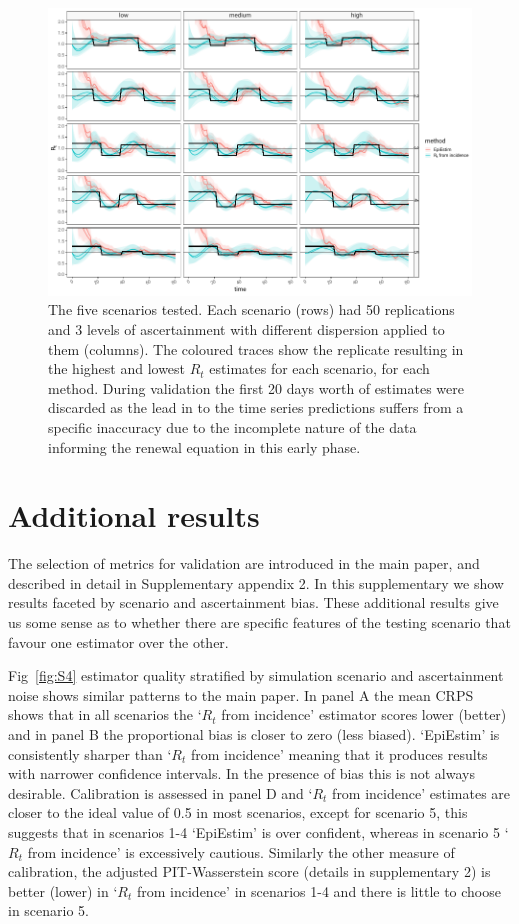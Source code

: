 \documentclass[a4paper, 12pt, twoside]{article}
\let\Oldsection\section
\renewcommand{\section}{\FloatBarrier\Oldsection}
\begin{document}
\begin{figure}[h!]
\centering
  \includegraphics{fig/fig3-scenario-estimates}
  \caption{The five scenarios tested. Each scenario (rows) had 50 replications and 3 levels of ascertainment with different dispersion applied to them (columns). The coloured traces show the replicate resulting in the highest and lowest $R_t$ estimates for each scenario, for each method. During validation the first 20 days worth of estimates were discarded as the lead in to the time series predictions suffers from a specific inaccuracy due to the incomplete nature of the data informing the renewal equation in this early phase.}
\label{fig:S3}
\end{figure}

\clearpage

\section{Additional results}

The selection of metrics for validation are introduced in the main paper, and described in detail in Supplementary appendix 2. In this supplementary we show results faceted by scenario and ascertainment bias. These additional results give us some sense as to whether there are specific features of the testing scenario that favour one estimator over the other.

Fig~\ref{fig:S4} estimator quality stratified by simulation scenario and ascertainment noise shows similar patterns to the main paper. In panel A the mean CRPS shows that in all scenarios the `$R_t$ from incidence' estimator scores lower (better) and in panel B the proportional bias is closer to zero (less biased). `EpiEstim' is consistently sharper than `$R_t$ from incidence' meaning that it produces results with narrower confidence intervals. In the presence of bias this is not always desirable. Calibration is assessed in panel D and `$R_t$ from incidence' estimates are closer to the ideal value of 0.5 in most scenarios, except for scenario 5, this suggests that in scenarios 1-4 `EpiEstim' is over confident, whereas in scenario 5 `$R_t$ from incidence' is excessively cautious. Similarly the other measure of calibration, the adjusted PIT-Wasserstein score (details in supplementary 2) is better (lower) in `$R_t$ from incidence' in scenarios 1-4 and there is little to choose in scenario 5.
\end{document}
